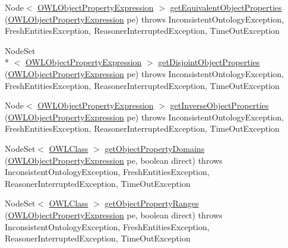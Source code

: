 \begin{DoxyCompactItemize}
Node$<$ \hyperlink{interfaceorg_1_1semanticweb_1_1owlapi_1_1model_1_1_o_w_l_object_property_expression}{O\-W\-L\-Object\-Property\-Expression} $>$ \hyperlink{interfaceorg_1_1semanticweb_1_1owlapi_1_1reasoner_1_1_o_w_l_reasoner_a38c0fd6583c42adb2a691cc7c477872a}{get\-Equivalent\-Object\-Properties} (\hyperlink{interfaceorg_1_1semanticweb_1_1owlapi_1_1model_1_1_o_w_l_object_property_expression}{O\-W\-L\-Object\-Property\-Expression} pe)  throws Inconsistent\-Ontology\-Exception, Fresh\-Entities\-Exception, Reasoner\-Interrupted\-Exception, Time\-Out\-Exception
\item 
Node\-Set\\*
$<$ \hyperlink{interfaceorg_1_1semanticweb_1_1owlapi_1_1model_1_1_o_w_l_object_property_expression}{O\-W\-L\-Object\-Property\-Expression} $>$ \hyperlink{interfaceorg_1_1semanticweb_1_1owlapi_1_1reasoner_1_1_o_w_l_reasoner_aa9e4507afde2f864c017e417985de2e2}{get\-Disjoint\-Object\-Properties} (\hyperlink{interfaceorg_1_1semanticweb_1_1owlapi_1_1model_1_1_o_w_l_object_property_expression}{O\-W\-L\-Object\-Property\-Expression} pe)  throws Inconsistent\-Ontology\-Exception, Fresh\-Entities\-Exception, Reasoner\-Interrupted\-Exception, Time\-Out\-Exception
\item 
Node$<$ \hyperlink{interfaceorg_1_1semanticweb_1_1owlapi_1_1model_1_1_o_w_l_object_property_expression}{O\-W\-L\-Object\-Property\-Expression} $>$ \hyperlink{interfaceorg_1_1semanticweb_1_1owlapi_1_1reasoner_1_1_o_w_l_reasoner_a1960bc6267550e739a65f8dc65c93994}{get\-Inverse\-Object\-Properties} (\hyperlink{interfaceorg_1_1semanticweb_1_1owlapi_1_1model_1_1_o_w_l_object_property_expression}{O\-W\-L\-Object\-Property\-Expression} pe)  throws Inconsistent\-Ontology\-Exception, Fresh\-Entities\-Exception, Reasoner\-Interrupted\-Exception, Time\-Out\-Exception
\item 
Node\-Set$<$ \hyperlink{interfaceorg_1_1semanticweb_1_1owlapi_1_1model_1_1_o_w_l_class}{O\-W\-L\-Class} $>$ \hyperlink{interfaceorg_1_1semanticweb_1_1owlapi_1_1reasoner_1_1_o_w_l_reasoner_a309f7047538443742247c73d3f5ce34a}{get\-Object\-Property\-Domains} (\hyperlink{interfaceorg_1_1semanticweb_1_1owlapi_1_1model_1_1_o_w_l_object_property_expression}{O\-W\-L\-Object\-Property\-Expression} pe, boolean direct)  throws Inconsistent\-Ontology\-Exception, Fresh\-Entities\-Exception, Reasoner\-Interrupted\-Exception, Time\-Out\-Exception
\item 
Node\-Set$<$ \hyperlink{interfaceorg_1_1semanticweb_1_1owlapi_1_1model_1_1_o_w_l_class}{O\-W\-L\-Class} $>$ \hyperlink{interfaceorg_1_1semanticweb_1_1owlapi_1_1reasoner_1_1_o_w_l_reasoner_a5fc16703ef858d366ee851f1cc1eb7b9}{get\-Object\-Property\-Ranges} (\hyperlink{interfaceorg_1_1semanticweb_1_1owlapi_1_1model_1_1_o_w_l_object_property_expression}{O\-W\-L\-Object\-Property\-Expression} pe, boolean direct)  throws Inconsistent\-Ontology\-Exception, Fresh\-Entities\-Exception, Reasoner\-Interrupted\-Exception, Time\-Out\-Exception

\end{DoxyCompactItemize}
